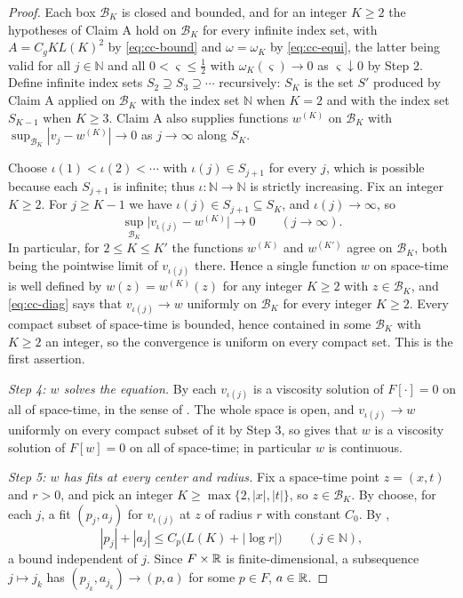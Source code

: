 \begin{proof}
Each box $\mathcal B_K$ is closed and bounded, and for an integer $K\ge2$ the
hypotheses of Claim A hold on $\mathcal B_K$ for every infinite index set, with
$A=C_gKL(K)^2$ by \eqref{eq:cc-bound} and $\omega=\omega_K$ by
\eqref{eq:cc-equi}, the latter being valid for all $j\in\mathbb N$ and all
$0<\varsigma\le\tfrac12$ with $\omega_K(\varsigma)\to0$ as
$\varsigma\downarrow0$ by Step 2. Define infinite index sets
$S_2\supseteq S_3\supseteq\cdots$ recursively: $S_K$ is the set $S'$ produced by
Claim A applied on $\mathcal B_K$ with the index set $\mathbb N$ when $K=2$ and
with the index set $S_{K-1}$ when $K\ge3$. Claim A also supplies functions
$w^{(K)}$ on $\mathcal B_K$ with
$\sup_{\mathcal B_K}|v_j-w^{(K)}|\to0$ as $j\to\infty$ along $S_K$.

Choose $\iota(1)<\iota(2)<\cdots$ with $\iota(j)\in S_{j+1}$ for every $j$,
which is possible because each $S_{j+1}$ is infinite; thus
$\iota:\mathbb N\to\mathbb N$ is strictly increasing. Fix an integer $K\ge2$.
For $j\ge K-1$ we have $\iota(j)\in S_{j+1}\subseteq S_K$, and
$\iota(j)\to\infty$, so
\begin{equation}\label{eq:cc-diag}
  \sup_{\mathcal B_K}\bigl|v_{\iota(j)}-w^{(K)}\bigr|\longrightarrow0
  \qquad(j\to\infty).
\end{equation}
In particular, for $2\le K\le K'$ the functions $w^{(K)}$ and $w^{(K')}$ agree
on $\mathcal B_K$, both being the pointwise limit of $v_{\iota(j)}$ there. Hence
a single function $w$ on space-time is well defined by $w(z)=w^{(K)}(z)$ for any
integer $K\ge2$ with $z\in\mathcal B_K$, and \eqref{eq:cc-diag} says that
$v_{\iota(j)}\to w$ uniformly on $\mathcal B_K$ for every integer $K\ge2$. Every
compact subset of space-time is bounded, hence contained in some
$\mathcal B_K$ with $K\ge2$ an integer, so the convergence is uniform on every
compact set. This is the first assertion.

\emph{Step 4: $w$ solves the equation.}
By  each $v_{\iota(j)}$ is a viscosity solution of
$F[\cdot]=0$ on all of space-time, in the sense of
. The whole space is open, and
$v_{\iota(j)}\to w$ uniformly on every compact subset of it by Step 3, so
 gives that $w$ is a viscosity solution of $F[w]=0$ on
all of space-time; in particular $w$ is continuous.

\emph{Step 5: $w$ has fits at every center and radius.}
Fix a space-time point $z=(x,t)$ and $r>0$, and pick an integer
$K\ge\max\{2,|x|,|t|\}$, so $z\in\mathcal B_K$. By  choose,
for each $j$, a fit $(p_j,a_j)$ for $v_{\iota(j)}$ at $z$ of radius $r$ with
constant $C_0$. By ,
\[
  |p_j|+|a_j|\le C_p\bigl(L(K)+|\log r|\bigr)\qquad(j\in\mathbb N),
\]
a bound independent of $j$. Since $F\times\mathbb{R}$ is finite-dimensional, a
subsequence $j\mapsto j_k$ has $(p_{j_k},a_{j_k})\to(p,a)$ for some
$p\in F$, $a\in\mathbb{R}$.


\end{proof}
